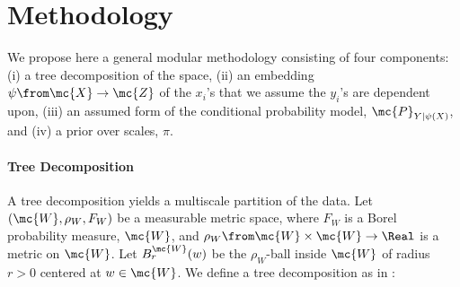 \section{Methodology} \label{sec:method}

We propose here a general modular methodology consisting of four components: (i) a tree decomposition of the space, (ii) an embedding $\psi \from \mc{X} \to \mc{Z}$ of the $x_i$'s that we assume the $y_i$'s are dependent upon, (iii) an assumed form of the conditional probability model, $\mc{P}_{Y|\psi(X)}$, and (iv) a prior over scales, $\pi$.

\paragraph{Tree Decomposition}
A tree decomposition yields a multiscale partition of the data.  Let $(\mc{W},\rho_W, F_W)$ be a measurable metric space, where $F_W$ is a Borel probability measure, $\mc{W}$, and $\rho_W \from \mc{W} \times \mc{W} \to \Real$ is a metric on $\mc{W}$.  Let $B_r^{\mc{W}}(w)$ be the $\rho_W$-ball inside $\mc{W}$ of radius $r > 0$ centered at $w \in \mc{W}$. We define a tree decomposition as in \cite{Allard2012}:

